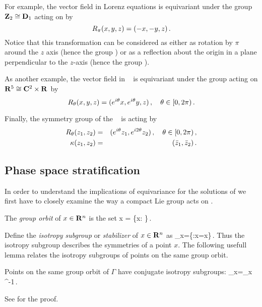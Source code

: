 For example, the vector field in Lorenz equations   is equivariant under the group
$\mathbf{Z}_2\cong\mathbf{D}_1$ acting on  by
\[
	R_{\pi}(x,y,z) = (-x,-y,z)\,.
\]
Notice that this transformation can be considered as either as rotation by $\pi$ around the $z$ axis (hence the
group ) or as a reflection about the origin in a plane perpendicular to the $z$-axis (hence the group ).

As another example, the vector field in \CLe~  is equivariant under the group  acting on $\mathbf{R}^{5}\cong \mathbf{C}^{2}\times \mathbf{R}^{}$
by
\[
 \Rot{\theta} (x,y,z) = (e^{i\theta} x, e^{i\theta} y, z)\,,\ \ \  \theta\in[0,2\pi)\,.
\]

Finally, the symmetry group of the \AGHe~ is  acting by
\begin{eqnarray*}
  R_{\theta}(z_1,z_2) &=& (e^{i\theta} z_1, e^{i 2\theta} z_2)\,,\ \ \  \theta\in[0,2\pi)\,,\\
  \kappa(z_1,z_2) &=& (\bar{z}_1,\bar{z}_2)\,.
\end{eqnarray*}


\subsection{Phase space stratification}

In order to understand the implications of equivariance for the solutions
of  we first have to closely examine the way a compact 
Lie group acts on .

 The \emph{group orbit} of $x\in\mathbf{R}^{n}$ is the set
\beq
	\Gamma x = \{\gamma x: \gamma\in\Gamma\}\,.
\eeq

 Define the \emph{isotropy subgroup} or \emph{stabilizer} of $x\in\mathbf{R}^{n}$ as
\beq
	\Sigma_x=\{\gamma\in\Gamma:\gamma x=x\}\,.
\eeq
Thus the isotropy subgroup describes the symmetries of a point $x$. The following usefull lemma
relates the isotropy subgroups of points on the same group orbit.

\begin{lemma}
\label{lm:stabGorbit}
Points on the same group orbit of $\Gamma$ have conjugate isotropy subgroups:
\beq
	\Sigma_{\gamma x}=\gamma \Sigma_x \gamma^{-1}\,.
\eeq
\end{lemma}
See  for the proof.

